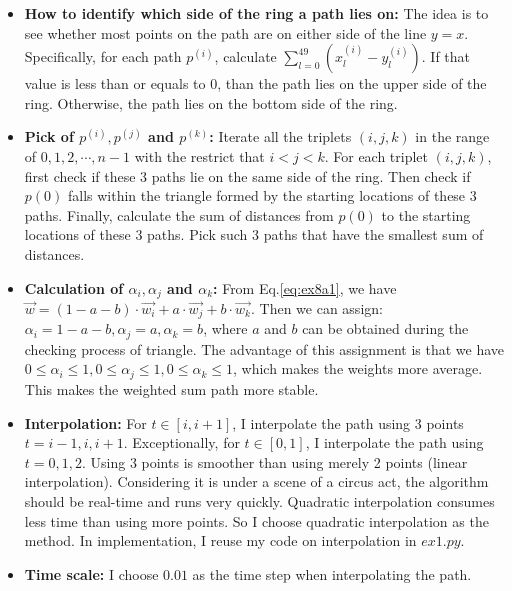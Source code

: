 \documentclass[
  course = {{16-811 Math Fundamentals for Robotics}},
  quartile = {{1}},
  assignment = 2,
  name = {{Kangle Deng}},
  email = {{kangled@andrew.cmu.edu}},
  firstexercise = 1
]{aga-homework}
\begin{document}
\begin{itemize}
    \item \noindent \textbf{How to identify which side of the ring a path lies on:} The idea is to see whether most points on the path are on either side of the line $y=x$. Specifically, for each path $p^{(i)}$, calculate $\sum \limits_{l=0}^{49} (x^{(i)}_l - y^{(i)}_l)$. If that value is less than or equals to $0$, than the path lies on the upper side of the ring. Otherwise, the path lies on the bottom side of the ring.
    
    \item \noindent \textbf{Pick of $p^{(i)},p^{(j)}$ and $p^{(k)}$:} Iterate all the triplets $(i,j,k)$ in the range of $0,1,2,\cdots,n-1$ with the restrict that $i < j < k$. For each triplet $(i, j, k)$, first check if these 3 paths lie on the same side of the ring. Then check if $p(0)$ falls within the triangle formed by the starting locations of these 3 paths. Finally, calculate the sum of distances from $p(0)$ to the starting locations of these 3 paths. Pick such 3 paths that have the smallest sum of distances.
    
    \item \noindent \textbf{Calculation of $\alpha_i, \alpha_j$ and $\alpha_k$:} From Eq.\ref{eq:ex8a1}, we have $\Vec{w} = (1-a-b) \cdot\Vec{w_i} + a \cdot \Vec{w_j} + b \cdot \Vec{w_k}.$ Then we can assign: $\alpha_i = 1-a-b, \alpha_j = a, \alpha_k=b$, where $a$ and $b$ can be obtained during the checking process of triangle. The advantage of this assignment is that we have $0 \le \alpha_i \le 1, 0 \le \alpha_j \le 1, 0 \le \alpha_k \le 1$, which makes the weights more average. This makes the weighted sum path more stable.
    
    \item \noindent \textbf{Interpolation:} For $t \in [i,i+1]$, I interpolate the path using 3 points $t = i-1, i, i+1$. Exceptionally, for $t \in [0,1]$, I interpolate the path using $t = 0, 1, 2$.
    Using 3 points is smoother than using merely 2 points (linear interpolation). Considering it is under a scene of a circus act, the algorithm should be real-time and runs very quickly. Quadratic interpolation consumes less time than using more points. So I choose quadratic interpolation as the method. In implementation, I reuse my code on interpolation in $ex1.py$.
    
    \item \noindent \textbf{Time scale:} I choose $0.01$ as the time step when interpolating the path.
\end{itemize}
\end{document}
